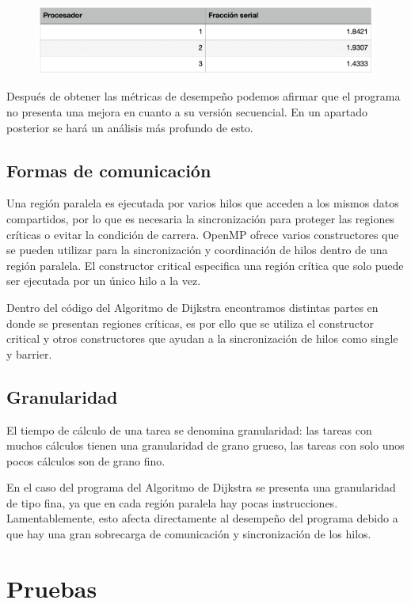 \documentclass[11pt]{article}
\begin{document}
\begin{figure}[!htbp]
\centering
\includegraphics[width=1\linewidth]{fraccion}
\end{figure}

Después de obtener las métricas de desempeño podemos afirmar que el programa no presenta una mejora en cuanto a su versión secuencial. En un apartado posterior se hará un análisis más profundo de esto.

\subsection{Formas de comunicación}
Una región paralela es ejecutada por varios hilos que acceden a los mismos datos compartidos, por lo que es necesaria la sincronización para proteger las regiones críticas o evitar la condición de carrera. OpenMP ofrece varios constructores que se pueden utilizar para la sincronización y coordinación de hilos dentro de una región paralela. El constructor critical especifica una región crítica que solo puede ser ejecutada por un único hilo a la vez. 
\par
Dentro del código del Algoritmo de Dijkstra encontramos distintas partes en donde se presentan regiones críticas, es por ello que se utiliza el constructor critical y otros constructores que ayudan a la sincronización de hilos como single y barrier.

\subsection{Granularidad}
El tiempo de cálculo de una tarea se denomina granularidad: las tareas con muchos cálculos tienen una granularidad de grano grueso, las tareas con solo unos pocos cálculos son de grano fino. 
\par
En el caso del programa del Algoritmo de Dijkstra se presenta una granularidad de tipo fina, ya que en cada región paralela hay pocas instrucciones. Lamentablemente, esto afecta directamente al desempeño del programa debido a que hay una gran sobrecarga de comunicación y sincronización de los hilos.

\section{Pruebas}
\end{document}
